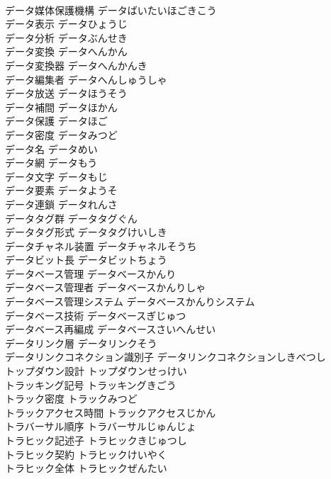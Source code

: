 \documentclass[8pt]{extreport}
\begin{document}
\begin{CJK}{UTF8}{min}
\\	データ媒体保護機構	データばいたいほごきこう	
\\	データ表示	データひょうじ	
\\	データ分析	データぶんせき	
\\	データ変換	データへんかん	
\\	データ変換器	データへんかんき	
\\	データ編集者	データへんしゅうしゃ	
\\	データ放送	データほうそう	
\\	データ補間	データほかん	
\\	データ保護	データほご	
\\	データ密度	データみつど	
\\	データ名	データめい	
\\	データ網	データもう	
\\	データ文字	データもじ	
\\	データ要素	データようそ	
\\	データ連鎖	データれんさ	
\\	データタグ群	データタグぐん	
\\	データタグ形式	データタグけいしき	
\\	データチャネル装置	データチャネルそうち	
\\	データビット長	データビットちょう	
\\	データベース管理	データベースかんり	
\\	データベース管理者	データベースかんりしゃ	
\\	データベース管理システム	データベースかんりシステム	
\\	データベース技術	データベースぎじゅつ	
\\	データベース再編成	データベースさいへんせい	
\\	データリンク層	データリンクそう	
\\	データリンクコネクション識別子	データリンクコネクションしきべつし	
\\	トップダウン設計	トップダウンせっけい	
\\	トラッキング記号	トラッキングきごう	
\\	トラック密度	トラックみつど	
\\	トラックアクセス時間	トラックアクセスじかん	
\\	トラバーサル順序	トラバーサルじゅんじょ	
\\	トラヒック記述子	トラヒックきじゅつし	
\\	トラヒック契約	トラヒックけいやく	
\\	トラヒック全体	トラヒックぜんたい	

\end{CJK}
\end{document}
